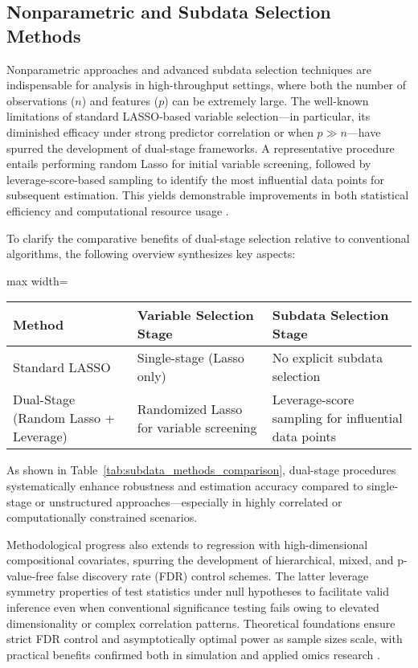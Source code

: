 \documentclass[sigconf]{acmart}
\begin{document}
\subsection{Nonparametric and Subdata Selection Methods}

Nonparametric approaches and advanced subdata selection techniques are indispensable for analysis in high-throughput settings, where both the number of observations ($n$) and features ($p$) can be extremely large. The well-known limitations of standard LASSO-based variable selection—in particular, its diminished efficacy under strong predictor correlation or when $p \gg n$—have spurred the development of dual-stage frameworks. A representative procedure entails performing random Lasso for initial variable screening, followed by leverage-score-based sampling to identify the most influential data points for subsequent estimation. This yields demonstrable improvements in both statistical efficiency and computational resource usage \cite{ref100}.

To clarify the comparative benefits of dual-stage selection relative to conventional algorithms, the following overview synthesizes key aspects:

\begin{table*}[htbp]
\centering
\caption{Comparison of Traditional and Dual-Stage Subdata Selection Methods}
\label{tab:subdata_methods_comparison}
\begin{adjustbox}{max width=\textwidth}
\begin{tabular}{lll}
\toprule
\textbf{Method} & \textbf{Variable Selection Stage} & \textbf{Subdata Selection Stage} \\
\midrule
Standard LASSO & Single-stage (Lasso only) & No explicit subdata selection \\
Dual-Stage (Random Lasso + Leverage) & Randomized Lasso for variable screening & Leverage-score sampling for influential data points \\
\bottomrule
\end{tabular}
\end{adjustbox}
\end{table*}

As shown in Table~\ref{tab:subdata_methods_comparison}, dual-stage procedures systematically enhance robustness and estimation accuracy compared to single-stage or unstructured approaches—especially in highly correlated or computationally constrained scenarios.

Methodological progress also extends to regression with high-dimensional compositional covariates, spurring the development of hierarchical, mixed, and p-value-free false discovery rate (FDR) control schemes. The latter leverage symmetry properties of test statistics under null hypotheses to facilitate valid inference even when conventional significance testing fails owing to elevated dimensionality or complex correlation patterns. Theoretical foundations ensure strict FDR control and asymptotically optimal power as sample sizes scale, with practical benefits confirmed both in simulation and applied omics research \cite{ref102}.
\end{document}
